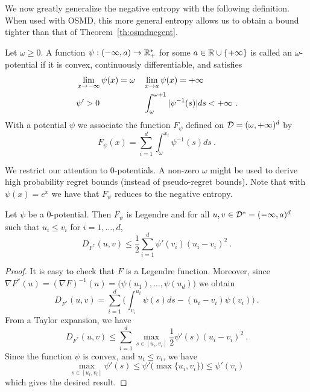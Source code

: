 %
%
We now greatly generalize the negative entropy with the following definition. When used with OSMD, this more general entropy allows us to obtain a bound tighter than that of Theorem~\ref{th:osmdnegent}.
\begin{definition}
Let $\omega \ge 0$.
A function 
$\psi: (-\infty,a) \rightarrow \mathbb{R}^*_+$ for some 
$a\in\mathbb{R}\cup\{+\infty\}$ is called an 
$\omega$-potential if it is convex,
 continuously differentiable, and satisfies
\begin{align*} 
& \lim_{x\rightarrow -\infty} \psi(x)=\omega &&
\lim_{x\rightarrow a} \psi(x)= +\infty \notag \\
& \psi' > 0 && \int_{\omega}^{\omega+1} |\psi^{-1}(s)|ds <+\infty~.
\end{align*}
With a potential $\psi$ we associate the function $F_{\psi}$ defined on $\mathcal{D}=(\omega, +\infty)^d$ by
$$F_{\psi}(x) = \sum_{i=1}^d \int_{\omega}^{x_i} \psi^{-1}(s) ds~.$$
\end{definition}
%
We restrict our attention to $0$-potentials. A non-zero $\omega$ might be used to derive high probability regret bounds (instead of pseudo-regret bounds). Note that with $\psi(x)=e^x$ we have that $F_{\psi}$ reduces to the negative entropy.
\begin{lemma} \label{lem:psi}
Let $\psi$ be a $0$-potential. Then $F_{\psi}$ is Legendre
and for all $u,v \in \mathcal{D}^*=(-\infty,a)^d$ such that $u_i \leq v_i$ for $i=1,\hdots,d$,
$$D_{F^*}(u,v) \leq \frac{1}{2} \sum_{i=1}^d \psi'(v_i) (u_i - v_i)^2~.$$
\end{lemma}
%
\begin{proof}
It is easy to check that $F$ is a Legendre function. Moreover, since
	$
  \nabla F^*(u)= (\nabla F)^{-1}(u)= \big(\psi(u_1),\dots,\psi(u_d)\big)
	$
we obtain
	$$
  D_{F^*}(u,v)=\sum_{i=1}^d \bigg(\int_{v_i}^{u_i} \psi(s)ds-(u_i-v_i)\psi(v_i)\bigg)~.
  $$
From a Taylor expansion, we have
	$$
	D_{F^*}(u,v)\le\sum_{i=1}^d \max_{s\in[u_i,v_i]} \frac12 \psi'(s) (u_i-v_i)^2~.
	$$
Since the function $\psi$ is convex, and $u_i \leq v_i$, we have
	$$
	\max_{s\in[u_i,v_i]} \psi'(s) \le \psi'\big(\max\{u_i,v_i\}\big) \leq \psi'(v_i)
	$$
which gives the desired result.
\end{proof}
